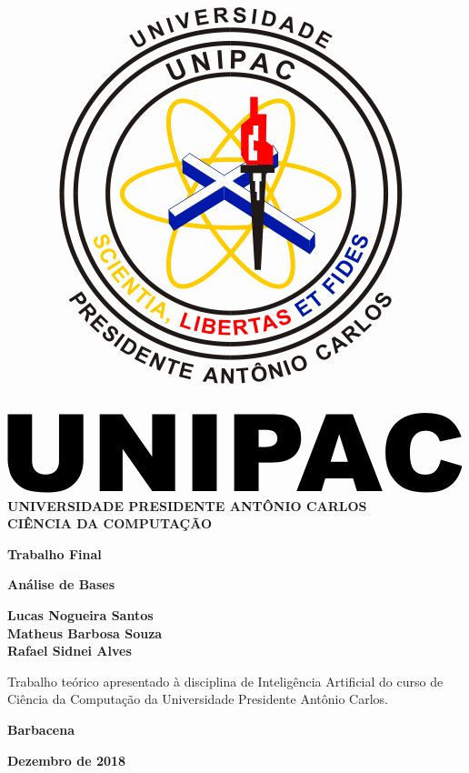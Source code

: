 \documentclass[12pt,a4paper]{article}
\begin{document}
\begin{titlepage}
    \vfill
	\begin{center}
    \includegraphics[scale=1.0]{imagens/logo.png}\\
	\textbf{UNIVERSIDADE PRESIDENTE ANTÔNIO CARLOS \\ CIÊNCIA DA COMPUTAÇÃO}

	\vspace{0.6cm}
	\vspace{4cm}
	{\huge \textbf{Trabalho Final}}
	
	{\huge \textbf{Análise de Bases}}\vspace{8mm}
	
	{\large \textbf{Lucas Nogueira Santos \\ Matheus Barbosa Souza \\ Rafael Sidnei Alves}}\\[3cm]
	
		\hspace{.45\textwidth} %
	   \begin{minipage}{.5\textwidth}
	   Trabalho teórico apresentado à disciplina de Inteligência Artificial do curso de Ciência da Computação da Universidade Presidente Antônio Carlos.\\[0.1cm]
	  \end{minipage}
	  \vfill
	
	\textbf{Barbacena}
	
	\textbf{Dezembro de 2018}
	\end{center}
	
\end{titlepage}

\newpage
\setcounter{secnumdepth}{5}
\tableofcontents
\newpage

 \newpage
 \newpage
 \newpage
 \newpage
 \newpage

\end{document}
